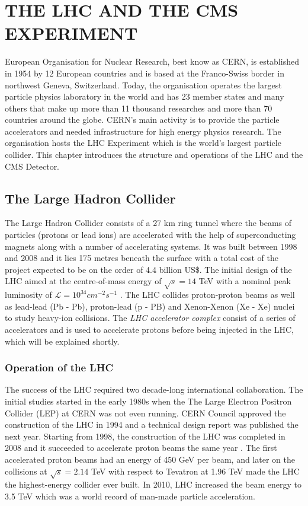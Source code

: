 \chapter{THE LHC AND THE CMS EXPERIMENT}\label{Ch2}

European Organisation for Nuclear Research, best know as CERN, is established in 1954 by 12 European countries and is based at the Franco-Swiss border in northwest Geneva, Switzerland. Today, the organisation operates the largest particle physics laboratory in the world and has 23 member states \cite{CERN:2771424} and many others that make up more than 11 thousand researches and more than 70 countries around the globe. CERN's main activity is to provide the particle accelerators and needed infrastructure for high energy physics research. The organisation hosts the LHC Experiment which is the world's largest particle collider. This chapter introduces the structure and operations of the LHC and the CMS Detector.

\section{The Large Hadron Collider}\label{LHC}

The Large Hadron Collider consists of a 27 km ring tunnel where the beams of particles (protons or lead ions) are accelerated with the help of superconducting magnets along with a number of accelerating systems. It was built between 1998 and 2008 and it lies 175 metres beneath the surface with a total cost of the project expected to be on the order of 4.4 billion US\$. The initial design of the LHC aimed at the centre-of-mass energy of $\sqrt{s}=14$ TeV with a nominal peak luminosity of $\mathcal{L} = 10^{34}cm^{-2}s^{-1}$ \cite{Baconnier:257706}. The LHC collides proton-proton beams as well as lead-lead (Pb - Pb), proton-lead (p - PB) and Xenon-Xenon (Xe - Xe) nuclei to study heavy-ion collisions. The \emph{LHC accelerator complex} consist of a series of accelerators and is used to accelerate protons before being injected in the LHC, which will be explained shortly.

\subsection{Operation of the LHC}

The success of the LHC required two decade-long international collaboration. The initial studies started in the early 1980s when the The Large Electron Positron Collider (LEP) at CERN was not even running. CERN Council approved the construction of the LHC in 1994 and a technical design report was published the next year. Starting from 1998, the construction of the LHC was completed in 2008 and it succeeded to accelerate proton beams the same year \cite{lhcfirstbeams}. The first accelerated proton beams had an energy of 450 GeV per beam, and later on the collisions at $\sqrt{s}=2.14$ TeV with respect to Tevatron at 1.96 TeV made the LHC the highest-energy collider ever built. In 2010, LHC increased the beam energy to 3.5 TeV which was a world record of man-made particle acceleration.

